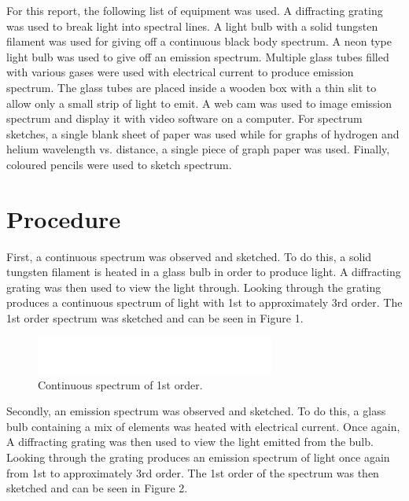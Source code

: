 \documentclass{article}
\begin{document}
For this report, the following list of equipment was used. A diffracting grating was used
to break light into spectral lines. A light bulb with a solid tungsten filament was
used for giving off a continuous black body spectrum. A neon type light bulb was 
used to give off an emission spectrum. Multiple glass tubes filled with
various gases were used with electrical current to produce emission spectrum. 
The glass tubes are placed inside a wooden box with a thin slit to allow only
a small strip of light to emit. A web cam
was used to image emission spectrum and display it with video software on a computer.
For spectrum sketches, a single blank sheet of paper was used while for graphs
of hydrogen and helium wavelength vs. distance, a single piece of graph paper was used.
Finally, coloured pencils were used to sketch spectrum.


\section{Procedure}

First, a continuous spectrum was observed and sketched. To do this, a solid tungsten 
filament is heated in a glass bulb in order to produce light. A diffracting grating was
then used to view the light through. Looking through the grating produces a continuous 
spectrum of light with 1st to approximately 3rd order. The 1st order spectrum was 
sketched and can be seen in Figure 1.\\

\begin{figure}[h]
\centering
\includegraphics[width=0.7\textwidth]{images/BlankSpectrum}
\caption{Continuous spectrum of 1st order.\label{fig:cont}}
\end{figure}

Secondly, an emission spectrum was observed and sketched. To do this, a glass bulb 
containing a mix of elements was heated with electrical current. Once again, A 
diffracting grating was then used to view the light emitted from the bulb. Looking
through the grating produces an emission spectrum of light once again from 1st to
approximately 3rd order. The 1st order of the spectrum was then sketched and can be seen 
in Figure 2.\\
\end{document}
